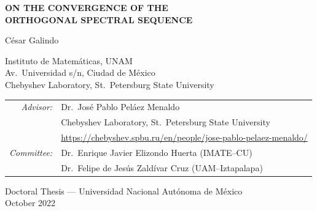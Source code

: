 \documentclass[12pt,a4paper]{article}
\theoremstyle{definition}
\begin{document}
\thispagestyle{empty}

\begin{center}

\vspace*{1.5cm}

{\Large\bfseries
ON THE CONVERGENCE OF THE\\[4pt]
ORTHOGONAL SPECTRAL SEQUENCE
}

\vspace{1.8cm}

{\large César Galindo}

\vspace{0.4cm}

{\normalsize
Instituto de Matemáticas, UNAM\\
Av.\ Universidad s/n, Ciudad de México\\
Chebyshev Laboratory, St.\ Petersburg State University
}

\vspace{2cm}

\begin{tabular}{rl}
\textit{Advisor:} &
Dr.\ José Pablo Peláez Menaldo \\[2pt]
& \small Chebyshev Laboratory, St.\ Petersburg State University \\[2pt]
& \small \url{https://chebyshev.spbu.ru/en/people/jose-pablo-pelaez-menaldo/} \\[8pt]

\textit{Committee:} &
Dr.\ Enrique Javier Elizondo Huerta (IMATE--CU) \\[2pt]
&
Dr.\ Felipe de Jesús Zaldívar Cruz (UAM--Iztapalapa)
\end{tabular}

\vspace{2cm}

{\normalsize
Doctoral Thesis — Universidad Nacional Autónoma de México\\
October 2022
}

\end{center}

\newpage
\end{document}
